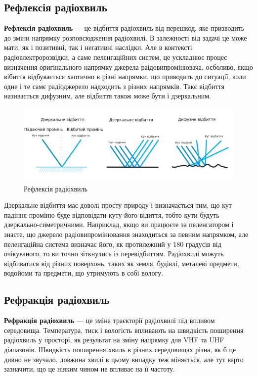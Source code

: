 \documentclass{article}
\begin{document}
\subsection{Рефлексія радіохвиль}

\textbf{Рефлексія радіохвиль} --- це відбиття радіохвиль від перешкод, яке призводить до зміни напрямку розповсюдження радіохвилі. В залежності від задачі це може мати, як і позитивні, так і негативні наслідки. Але в контексті радіоелектророзвідки, а саме пеленгаційних систем, це ускладнює процес визначення оригінального напрямку джерела раідовипромінювача, осболиво, якщо вібиття відбувається хаотично в різні напрямки, що приводить до ситуації, коли одне і те самє радіоджерело надходить з різних напрямків. Такє відбиття називається дифузним, але відбиття також може бути і дзеркальним. 

\begin{figure}[h!]
	\centering
	\includegraphics[width=0.8\linewidth]{images/reflection.png}
	\caption{\label{fig:reflection}Рефлексія радіохвиль}
\end{figure}

Дзеркальне відбиття має доволі просту природу і визначається тим, що кут падіння проміню буде відповідати куту його відиття, тобто кути будуть дзеркально-симетричними. Наприклад, якщо ви працюєте за пеленгатором і знаєте, що джерело радіовипромінювання знаходиться за певним напрямком, але пеленгаційна система визначає його, як протилежний у 180 градусів від очікуваного, то ви точно зіткнулись із перевідбиттям. Радіохвилі можуть відбиватися від різних поверхонь, таких як земля, будівлі, металеві предмети, водойоми та предмети, що утримують в собі вологу.

\newpage
\subsection{Рефракція радіохвиль}

\textbf{Рефракція радіохвиль} --- це зміна траєкторії радіохвилі під впливом середовища. Температура, тиск і вологість впливають на швидкість поширення радіохвиль у просторі, як результат на зміну напрямку для VHF та UHF діапазонів. Швидкість поширення хвиль в різних середовищах різна, як б це дивно не звучало, довжина хвилі в цьому випадку теж міняється, але тут варто зазначити, що це ніяким чином не впливає на її частоту.  
\end{document}
